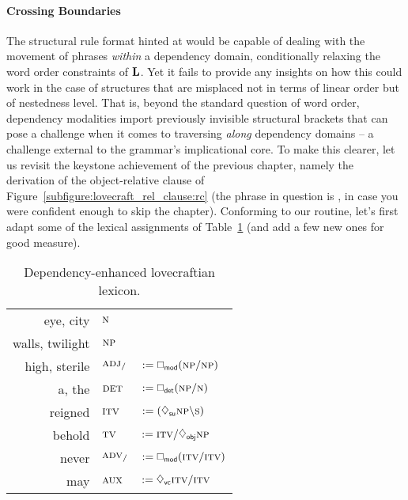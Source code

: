 \paragraph{Crossing Boundaries}
The structural rule format hinted at would be capable of dealing with the movement of phrases \textit{within} a dependency domain, conditionally relaxing the word order constraints of $\textbf{L}$.
Yet it fails to provide any insights on how this could work in the case of structures that are misplaced not in terms of linear order but of nestedness level.
That is, beyond the standard question of word order, dependency modalities import previously invisible structural brackets that can pose a challenge when it comes to traversing \textit{along} dependency domains -- a challenge external to the grammar's implicational core.
To make this clearer, let us revisit the keystone achievement of the previous chapter, namely the derivation of the object-relative clause of Figure~\ref{subfigure:lovecraft_rel_clause:rc} (the phrase in question is , in case you were confident enough to skip the chapter).
Conforming to our routine, let's first adapt some of the lexical assignments of Table~\ref{table:toy_dep_lexicon} (and add a few new ones for good measure).

\begin{table}
	\centering
	\begin{tabularx}{0.65\textwidth}{@{}r@{\quad::\quad}ll}
		eye, city									& $\smalln$\\
		walls, twilight								& $\smallnp$\\
		high, sterile								& $\textsc{\normalfont\textsc{adj}}_{/}$ & $:=\dbox{mod}(\smallnp\divright\smallnp)$\\
		a, the										& $\textsc{\normalfont\textsc{det}}$ & $:= \dbox{det}(\smallnp\divright\smalln)$\\
		reigned										& $\textsc{\normalfont\textsc{itv}}$ & $:=(\ddia{su}\smallnp\divleft\smalls)$\\
		behold										& $\textsc{\normalfont\textsc{tv}}$ & $:= \smallgtype{itv}\divright\ddia{obj}\smallnp$\\
		never										& $\textsc{\normalfont\textsc{adv}}_{/}$ & $:= \dbox{mod}(\smallgtype{itv}\divright\smallgtype{itv})$\\
		may											& $\textsc{\normalfont\textsc{aux}}$ & $:= \ddia{vc}\smallgtype{itv}\divright\smallgtype{itv}$
	\end{tabularx}
	\caption{Dependency-enhanced lovecraftian lexicon.}
	\label{table:toy_dep_lexicon}
\end{table}

